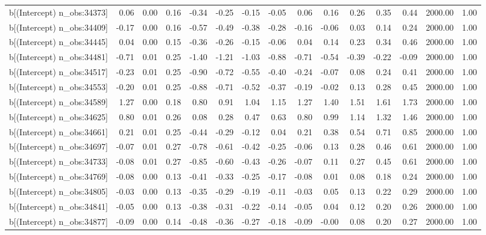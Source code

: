 \begin{table}[ht]
\begin{tabular}{rrrrrrrrrrrrrrr}
  b[(Intercept) n\_obs:34373] & 0.06 & 0.00 & 0.16 & -0.34 & -0.25 & -0.15 & -0.05 & 0.06 & 0.16 & 0.26 & 0.35 & 0.44 & 2000.00 & 1.00 \\ 
  b[(Intercept) n\_obs:34409] & -0.17 & 0.00 & 0.16 & -0.57 & -0.49 & -0.38 & -0.28 & -0.16 & -0.06 & 0.03 & 0.14 & 0.24 & 2000.00 & 1.00 \\ 
  b[(Intercept) n\_obs:34445] & 0.04 & 0.00 & 0.15 & -0.36 & -0.26 & -0.15 & -0.06 & 0.04 & 0.14 & 0.23 & 0.34 & 0.46 & 2000.00 & 1.00 \\ 
  b[(Intercept) n\_obs:34481] & -0.71 & 0.01 & 0.25 & -1.40 & -1.21 & -1.03 & -0.88 & -0.71 & -0.54 & -0.39 & -0.22 & -0.09 & 2000.00 & 1.00 \\ 
  b[(Intercept) n\_obs:34517] & -0.23 & 0.01 & 0.25 & -0.90 & -0.72 & -0.55 & -0.40 & -0.24 & -0.07 & 0.08 & 0.24 & 0.41 & 2000.00 & 1.00 \\ 
  b[(Intercept) n\_obs:34553] & -0.20 & 0.01 & 0.25 & -0.88 & -0.71 & -0.52 & -0.37 & -0.19 & -0.02 & 0.13 & 0.28 & 0.45 & 2000.00 & 1.00 \\ 
  b[(Intercept) n\_obs:34589] & 1.27 & 0.00 & 0.18 & 0.80 & 0.91 & 1.04 & 1.15 & 1.27 & 1.40 & 1.51 & 1.61 & 1.73 & 2000.00 & 1.00 \\ 
  b[(Intercept) n\_obs:34625] & 0.80 & 0.01 & 0.26 & 0.08 & 0.28 & 0.47 & 0.63 & 0.80 & 0.99 & 1.14 & 1.32 & 1.46 & 2000.00 & 1.00 \\ 
  b[(Intercept) n\_obs:34661] & 0.21 & 0.01 & 0.25 & -0.44 & -0.29 & -0.12 & 0.04 & 0.21 & 0.38 & 0.54 & 0.71 & 0.85 & 2000.00 & 1.00 \\ 
  b[(Intercept) n\_obs:34697] & -0.07 & 0.01 & 0.27 & -0.78 & -0.61 & -0.42 & -0.25 & -0.06 & 0.13 & 0.28 & 0.46 & 0.61 & 2000.00 & 1.00 \\ 
  b[(Intercept) n\_obs:34733] & -0.08 & 0.01 & 0.27 & -0.85 & -0.60 & -0.43 & -0.26 & -0.07 & 0.11 & 0.27 & 0.45 & 0.61 & 2000.00 & 1.00 \\ 
  b[(Intercept) n\_obs:34769] & -0.08 & 0.00 & 0.13 & -0.41 & -0.33 & -0.25 & -0.17 & -0.08 & 0.01 & 0.08 & 0.18 & 0.24 & 2000.00 & 1.00 \\ 
  b[(Intercept) n\_obs:34805] & -0.03 & 0.00 & 0.13 & -0.35 & -0.29 & -0.19 & -0.11 & -0.03 & 0.05 & 0.13 & 0.22 & 0.29 & 2000.00 & 1.00 \\ 
  b[(Intercept) n\_obs:34841] & -0.05 & 0.00 & 0.13 & -0.38 & -0.31 & -0.22 & -0.14 & -0.05 & 0.04 & 0.12 & 0.20 & 0.26 & 2000.00 & 1.00 \\ 
  b[(Intercept) n\_obs:34877] & -0.09 & 0.00 & 0.14 & -0.48 & -0.36 & -0.27 & -0.18 & -0.09 & -0.00 & 0.08 & 0.20 & 0.27 & 2000.00 & 1.00 \\ 

\end{tabular}
\end{table}
